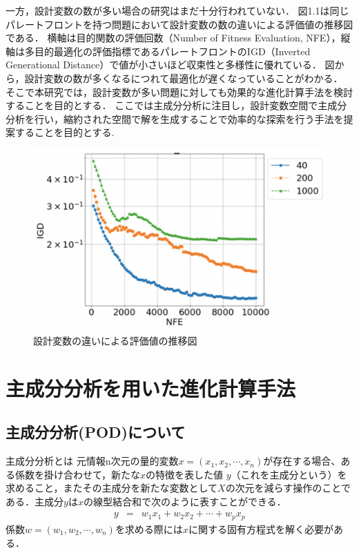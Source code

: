\documentclass[11pt,a4j,notitlepage]{jsarticle}
\begin{document}
一方，設計変数の数が多い場合の研究はまだ十分行われていない．
図1.1は同じパレートフロントを持つ問題において設計変数の数の違いによる評価値の推移図である．
横軸は目的関数の評価回数（Number of Fitness Evaluation, NFE），縦軸は多目的最適化の評価指標であるパレートフロントのIGD（Inverted Generational Distance）で値が小さいほど収束性と多様性に優れている．
図から，設計変数の数が多くなるにつれて最適化が遅くなっていることがわかる．
そこで本研究では，設計変数が多い問題に対しても効果的な進化計算手法を検討することを目的とする．
ここでは主成分分析に注目し，設計変数空間で主成分分析を行い，縮約された空間で解を生成することで効率的な探索を行う手法を提案することを目的とする.
\begin{figure}[htbp]
\begin{center}
  \includegraphics[width=0.5\linewidth]{img/fig1.png}
             \setlength{\abovecaptionskip}{0mm}
  \setlength{\belowcaptionskip}{0mm}
    \caption{設計変数の違いによる評価値の推移図}
\label{fig:nsgaiii}
\end{center}
\end{figure}
\vspace{-1.5zh}
\section{主成分分析を用いた進化計算手法}
\subsection{主成分分析(POD)について}
\vspace{-1.0zh}
主成分分析とは
元情報n次元の量的変数$x=(x_1,x_2,\cdots ,x_n)$が存在する場合、ある係数を掛け合わせて，新たな$x$の特徴を表した値 $y$（これを主成分という）を求めること，またその主成分を新たな変数として$X$の次元を減らす操作のことである．主成分$y$は$x$の線型結合和で次のように表すことができる．
\begin{eqnarray}
  y&=&w_1x_1+w_2x_2+\cdots+w_px_p
\end{eqnarray}
係数$w=(w_1,w_2,\cdots ,w_n)$を求める際には$x$に関する固有方程式を解く必要がある．
\vspace{-1.5zh}
\end{document}
